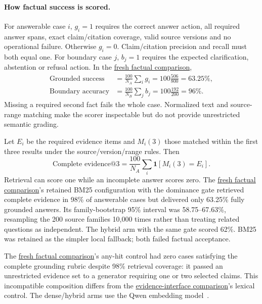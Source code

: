\paragraph{How factual success is scored.}
For answerable case $i$, $g_i=1$ requires the correct answer action, all required
answer spans, exact claim/citation coverage, valid source versions and no
operational failure. Otherwise $g_i=0$. Claim/citation precision and recall must
both equal one. For boundary case $j$, $b_j=1$ requires the expected
clarification, abstention or refusal action. In the \hyperref[study-B]{fresh factual comparison},
\begin{equation}
\begin{aligned}
\text{Grounded success}&=\frac{100}{N_A}\sum_i g_i
 =100\frac{506}{800}=63.25\%,\\
\text{Boundary accuracy}&=\frac{100}{N_B}\sum_j b_j
 =100\frac{192}{200}=96\%.
\end{aligned}
\label{eq:grounded-score}
\end{equation}
Missing a required second fact fails the whole case. Normalized text and source-range matching
make the scorer inspectable but do not provide unrestricted semantic grading.

Let $E_i$ be the required evidence items and $M_i(3)$ those matched within the
first three results under the source/version/range rules. Then
\begin{equation}
\text{Complete evidence@3}
=\frac{100}{N_A}\sum_i\mathbf{1}[M_i(3)=E_i].
\label{eq:retrieval-score}
\end{equation}
Retrieval can score one while an incomplete answer scores zero. The \hyperref[study-B]{fresh factual comparison}'s
retained BM25 configuration with the dominance gate retrieved complete evidence in 98\% of
answerable cases but delivered only 63.25\% fully grounded answers. Its
family-bootstrap 95\% interval was 58.75--67.63\%, resampling the 200 source
families 10,000 times rather than treating related questions as independent.
The hybrid arm with the same gate scored 62\%. BM25 was retained as the simpler local
fallback; both failed factual acceptance.

The \hyperref[study-B]{fresh factual comparison}'s any-hit control had zero cases satisfying the complete grounding rubric despite 98\% retrieval
coverage: it passed an unrestricted evidence set to a generator requiring one
or two selected claims. This incompatible composition differs from the \hyperref[study-A]{evidence-interface comparison}'s lexical
control. The dense/hybrid arms use the Qwen embedding model~\cite{qwen3-embedding-card}.

